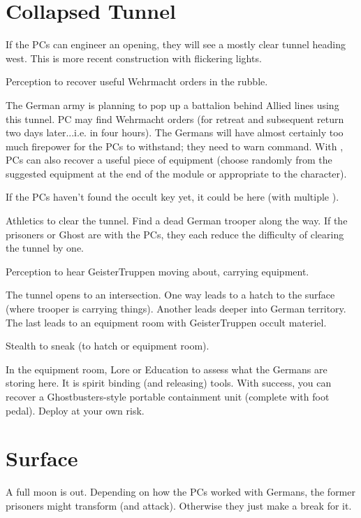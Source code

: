 \documentclass{book}
\newcommand{\df}{\DifficultyDie }
\newcommand{\stb}{\SetbackDie }
\begin{document}
\begin{multicols}{2}
\section{Collapsed Tunnel}

If the PCs can engineer an opening, they will see a mostly clear tunnel heading west.  This is more recent construction with flickering lights.

\df\df Perception to recover useful Wehrmacht orders in the rubble.

The German army is planning to pop up a battalion behind Allied lines using this tunnel.  PC may find Wehrmacht orders (for retreat and subsequent return two days later...i.e. in four hours).  The Germans will have almost certainly too much firepower for the PCs to withstand; they need to warn command.  With \Advantage\Advantage, PCs can also recover a useful piece of equipment (choose randomly from the suggested equipment at the end of the module or appropriate to the character).

If the PCs haven't found the occult key yet, it could be here (with multiple \Advantage).

\df\df\df Athletics to clear the tunnel.  Find a dead German trooper along the way.  
If the prisoners or Ghost are with the PCs, they each reduce the difficulty of clearing the tunnel by one.

\df\df Perception to hear GeisterTruppen moving about, carrying equipment.

The tunnel opens to an intersection.  One way leads to a hatch to the surface (where trooper is carrying things).  Another leads deeper into German territory.  The last leads to an equipment room with GeisterTruppen occult materiel.

\df\df Stealth to sneak (to hatch or equipment room).

In the equipment room, \df\df Lore or \df\df\stb Education to assess what the Germans are storing here.  It is spirit binding (and releasing) tools.  With success, you can recover a Ghostbusters-style portable containment unit (complete with foot pedal).  Deploy at your own risk.

\section{Surface}

A full moon is out.  Depending on how the PCs worked with Germans, the former prisoners might transform (and attack).  Otherwise they just make a break for it.


\end{multicols}
\end{document}
